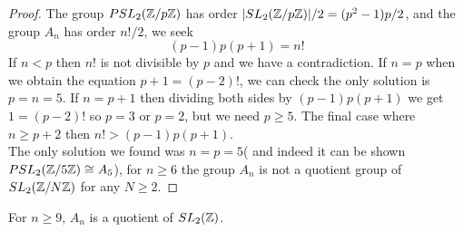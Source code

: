 \begin{proof}
The group $\psltznz[p]$ has order $\vert \sltznz[p] \vert /2 = (p^2 -1)p/2$,  and the group $A_n$ has order $n!/2$, we seek
$$(p-1)p(p+1) = n!$$
If $n < p$ then $n!$ is not divisible by $p$ and we have a contradiction. If $n = p$ when we obtain the equation $p+1 = (p-2)!$, we can check the only solution is $p = n =5$. If $n = p+1$ then dividing both sides by $(p-1)p(p+1)$ we get $1 = (p-2)!$ so $p = 3$ or $p =2$, but we need $p \geq 5$. The final case where $n \geq p +2$ then $n! > (p-1)p(p+1)$. \\
The only solution we found was $n = p =5$( and indeed it can be shown $\psltznz[5] \cong A_5$), for $n \geq 6$ the group $A_n$ is not a quotient group of $\sltznz$ for any $N \geq 2$. 

\end{proof}


\begin{theorem}\label{thm:anquotientsltz}
For $n \geq 9$, $A_n$ is a quotient of $\sltz$.
\end{theorem}

